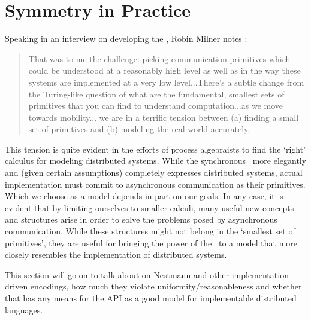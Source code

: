 \section{Symmetry in Practice}

Speaking in an interview on developing the \picalc, Robin Milner notes \cite{miln03}:
\begin{quote}
That was to me the challenge: picking communication primitives which could be understood at a reasonably high level as well as in the way these systems are implemented at a very low level...There's a subtle change from the Turing-like question of what are the fundamental, smallest sets of primitives that you can find to understand computation...as we move towards mobility... we are in a terrific tension between (a) finding a small set of primitives and (b) modeling the real world accurately.
\end{quote}
This tension is quite evident in the efforts of process algebraists to find the `right' calculus for modeling distributed systems.  While the synchronous \picalc\ more elegantly and (given certain assumptions) completely expresses distributed systems, actual implementation must commit to asynchronous communication as their primitives.  Which we choose as a model depends in part on our goals.  In any case, it is evident that by limiting ourselves to smaller calculi, many useful new concepts and structures arise in order to solve the problems posed by asynchronous communication.  While these structures might not belong in the `smallest set of primitives', they are useful for bringing the power of the \picalc\ to a model that more closely resembles the implementation of distributed systems.

This section will go on to talk about on Nestmann and other implementation-driven encodings, how much they violate uniformity/reasonableness and whether that has any means for the API as a good model for implementable distributed languages.